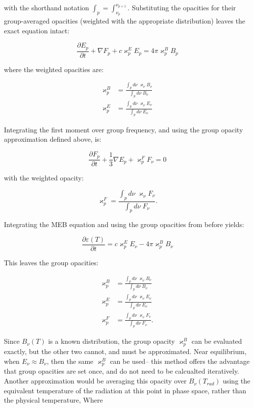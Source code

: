 \documentclass{template}
\begin{document}
with the shorthand notation $\int_p = \int_{\nu_p}^{\nu_{p+1}}$. Substituting the opacities for their group-averaged opacities (weighted with the appropriate distribution) leaves the exact equation intact:

\begin{equation}
    \boxed{\frac{\partial E_p}{\partial t} + \nabla F_p + c \varkappa_p^E E_p = 4\pi \varkappa_p^B B_p}
\end{equation}

where the weighted opacities are:

\begin{align}
    \varkappa_p^B  &= \frac{\int_p d\nu \; \varkappa_\nu B_\nu}{\int_p d\nu \; B_\nu}\\
    \varkappa_p^E &=  \frac{\int_p d\nu \; \varkappa_\nu E_\nu}{\int_p d\nu \; E_\nu}
\end{align}


Integrating the first moment over group frequency, and using the group opacity approximation defined above, is:

\begin{equation}
    \boxed{\frac{\partial F_p}{\partial t} + \frac{1}{3}\nabla E_p + \varkappa_p^F F_\nu = 0}
\end{equation}

with the weighted opacity:

\begin{equation}
    \varkappa_p^F  = \frac{\int_p d\nu \; \varkappa_\nu F_\nu}{\int_p d\nu \; F_\nu}.
\end{equation}

Integrating the MEB equation and using the group opacities from before yields:

\begin{equation}
    \boxed{\frac{\partial \varepsilon(T)}{\partial t} =  c\varkappa_p^E E_\nu - 4\pi \varkappa_p^B B_\nu}
\end{equation}

This leaves the group opacities:

\begin{align}
    \varkappa_p^B  &= \frac{\int_p d\nu \; \varkappa_\nu B_\nu}{\int_p d\nu \; B_\nu}\\
    \varkappa_p^E &=  \frac{\int_p d\nu \; \varkappa_\nu E_\nu}{\int_p d\nu \; E_\nu}\\
    \varkappa_p^F  &= \frac{\int_p d\nu \; \varkappa_\nu F_\nu}{\int_p d\nu \; F_\nu}.
\end{align}


Since $B_\nu(T)$ is a known distribution, the group opacity $\varkappa_p^B$ can be evaluated exactly, but the other two cannot, and must be approximated. Near equilibrium, when $E_\nu \approx B_\nu$, then the same $\varkappa_p^B$ can be used-- this method offers the advantage that group opacities are set once, and do not need to be calcualted iteratively. Another approximation would be averaging this opacity over $B_\nu(T_{rad})$ using the equivalent temperature of the radiation at this point in phase space, rather than the physical temperature, Where
\end{document}
